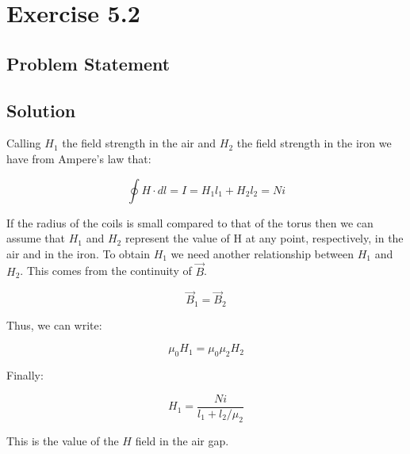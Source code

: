 \section*{Exercise 5.2}
\subsection*{Problem Statement}
\hfill
\begin{center}
\end{center}

\subsection*{Solution}

Calling $H_1$ the field strength in the air and $H_2$ the field strength in the
iron we have from Ampere's law that:

\[ 
    \oint H \cdot dl = I  = H_1 l_1 + H_2 l_2  = N i
\]

If the radius of the coils is small compared to that of the torus then we can
assume that $H_1$ and $H_2$ represent the value of H at any point, respectively,
in the air and in the iron. To obtain $H_1$ we need another relationship between
$H_1$ and $H_2$. This comes from the continuity of $\vec{B}$.

\[
    \vec{B}_1 = \vec{B}_2
\]

Thus, we can write:

\[ 
    \mu_0 H_1 = \mu_0 \mu_2 H_2 
\]

Finally:

\[ 
    H_1 = \frac{N i}{l_1 + l_2/\mu_2} 
\]

This is the value of the $H$ field in the air gap.
